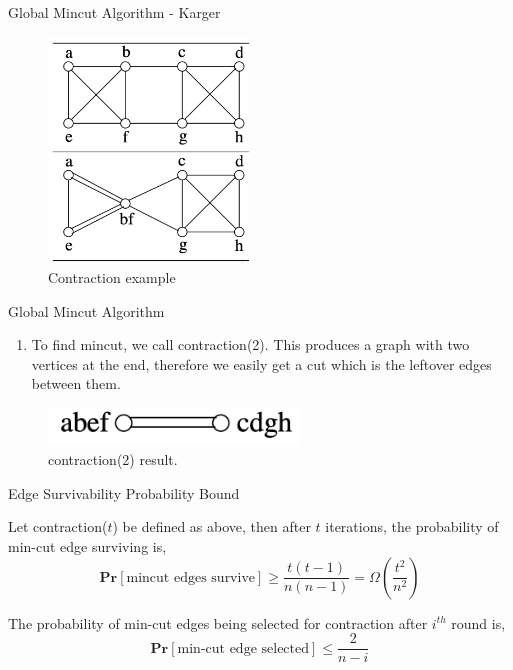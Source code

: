 \begin{frame}[fragile]{Global Mincut Algorithm - Karger}
    \begin{figure}
        \centering
        \includegraphics[height=6cm]{images/contraction.png}
        \caption{Contraction example}
        \label{fig:contraction}
    \end{figure}
\end{frame}

\begin{frame}[fragile]{Global Mincut Algorithm}
    \begin{enumerate}
        \item To find mincut, we call contraction(2). This produces a graph with two vertices at the end, therefore we easily get a cut which is the leftover edges between them.
    \end{enumerate}
    \begin{figure}
        \centering
        \includegraphics[height=1cm]{images/last-iter-contract.png}
        \caption{contraction(2) result. \cite{Arora_2010}}
        \label{fig:contraction-result}
    \end{figure}
\end{frame}

\begin{frame}{Edge Survivability Probability Bound}
    \setlength{\abovedisplayskip}{0pt}
    \setlength{\belowdisplayskip}{0pt}
    \setlength{\abovedisplayshortskip}{0pt}
    \setlength{\belowdisplayshortskip}{0pt}
    \begin{lemma}
        Let contraction($t$) be defined as above, then after $t$ iterations, the probability of min-cut edge surviving is,
        \[\textbf{Pr}[\text{mincut edges survive}] \geq \frac{t(t - 1)}{n(n - 1)} = \Omega\left(\frac{t^2}{n^2}\right)\]
    \end{lemma}
    \begin{lemma}
        \label{edge-surv-prob}
        The probability of min-cut edges being selected for contraction after $i^{th}$ round is,
        \[\textbf{Pr}[\text{min-cut edge selected}] \leq \frac{2}{n - i}\]
    \end{lemma}

\end{frame}

